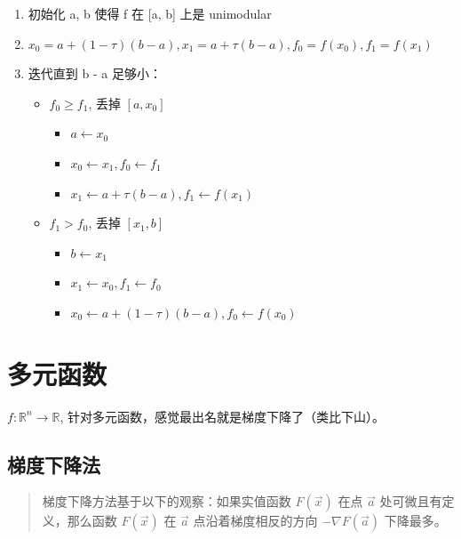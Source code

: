 \documentclass[
]{book}
\providecommand{\tightlist}{%
  \setlength{\itemsep}{0pt}\setlength{\parskip}{0pt}}
\begin{document}
\begin{enumerate}
\def\labelenumi{\arabic{enumi}.}
\tightlist
\item
  初始化 a, b 使得 f 在 {[}a, b{]} 上是 unimodular
\item
  \(x_0 = a + (1-\tau)(b-a), x_1 = a + \tau(b-a), f_0 = f(x_0), f_1 = f(x_1)\)
\item
  迭代直到 b - a 足够小：

  \begin{itemize}
  \tightlist
  \item
    \(f_0 \ge f_1\), 丢掉 \([a, x_0]\)

    \begin{itemize}
    \tightlist
    \item
      \(a \gets x_0\)
    \item
      \(x_0 \gets x_1, f_0 \gets f_1\)
    \item
      \(x_1 \gets a + \tau(b-a), f_1 \gets f(x_1)\)
    \end{itemize}
  \item
    \(f_1 > f_0\), 丢掉 \([x_1, b]\)

    \begin{itemize}
    \tightlist
    \item
      \(b \gets x_1\)
    \item
      \(x_1 \gets x_0, f_1 \gets f_0\)
    \item
      \(x_0 \gets a + (1-\tau)(b-a), f_0 \gets f(x_0)\)
    \end{itemize}
  \end{itemize}
\end{enumerate}

\hypertarget{ux591aux5143ux51fdux6570}{%
\section{多元函数}\label{ux591aux5143ux51fdux6570}}

\(f: \mathbb{R}^n \to \mathbb{R}\), 针对多元函数，感觉最出名就是梯度下降了（类比下山）。

\hypertarget{ux68afux5ea6ux4e0bux964dux6cd5}{%
\subsection{梯度下降法}\label{ux68afux5ea6ux4e0bux964dux6cd5}}

\begin{quote}
梯度下降方法基于以下的观察：如果实值函数 \(F(\vec{x})\) 在点 \(\vec {a}\) 处可微且有定义，那么函数 \(F(\vec{x})\) 在 \(\vec{a}\) 点沿着梯度相反的方向 \(-\nabla F({\vec {a}})\) 下降最多。
\end{quote}
\end{document}
